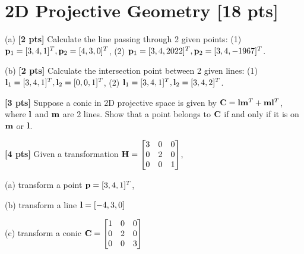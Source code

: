 \documentclass[11pt,addpoints,answers]{exam}
\numberwithin{equation}{section} %
\numberwithin{figure}{section} %
\numberwithin{table}{section} %
\begin{document}
\clearpage

\section{2D Projective Geometry  [18 pts]}
\begin{questions}

\question (a) \textbf{[2 pts]} Calculate the line passing through 2 given points: (1) $\mathbf{p}_1= [3,4,1]^T, \mathbf{p}_2 = [4,3,0]^T$, (2) $\mathbf{p}_1= [3,4,2022]^T, \mathbf{p}_2 = [3,4,-1967]^T$.

(b) \textbf{[2 pts]} Calculate the intersection point between 2 given lines: (1) $\mathbf{l}_1 = [3,4,1]^T, \mathbf{l}_2 = [0,0,1]^T $, (2) $\mathbf{l}_1= [3,4,1]^T, \mathbf{l}_2 = [3,4,2]^T$.

\begin{tcolorbox}[fit,height=5cm, width=\textwidth, blank, borderline={0.5pt}{-2pt},halign=left, valign=center, nobeforeafter]


\end{tcolorbox}

\question \textbf{[3 pts]} Suppose a conic in 2D projective space is given by $\mathbf{C} = \mathbf{l}\mathbf{m}^T + \mathbf{m}\mathbf{l}^T$, where $\mathbf{l}$ and $\mathbf{m}$ are 2 lines. Show that a point belongs to $\mathbf{C}$ if and only if it is on $\mathbf{m}$ or $\mathbf{l}$.

\begin{tcolorbox}[fit,height=5cm, width=\textwidth, blank, borderline={0.5pt}{-2pt},halign=left, valign=center, nobeforeafter]

\end{tcolorbox}

\question \textbf{[4 pts]} Given a transformation $\mathbf{H} = \begin{bmatrix}
                 3 & 0 & 0  \\
                 0 & 2 & 0  \\
                 0 & 0 & 1  \\
                \end{bmatrix}$,

(a) transform a point $\mathbf{p} = [3,4,1]^T$,

(b) transform a line $\mathbf{l} = [-4, 3, 0]$

(c) transform a conic $\mathbf{C} = \begin{bmatrix}
                 1 & 0 & 0  \\
                 0 & 2 & 0  \\
                 0 & 0 & 3  \\
                \end{bmatrix}$


\end{questions}
\end{document}
